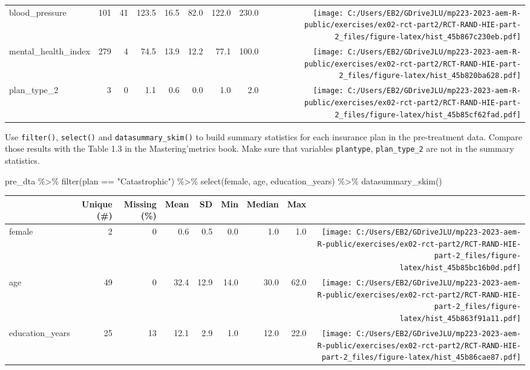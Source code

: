 \documentclass[
  letterpaper,
  DIV=11,
  numbers=noendperiod]{scrartcl}
\newenvironment{Shaded}{\begin{snugshade}}{\end{snugshade}}
\newcommand{\FunctionTok}[1]{\textcolor[rgb]{0.28,0.35,0.67}{#1}}
\newcommand{\NormalTok}[1]{\textcolor[rgb]{0.00,0.23,0.31}{#1}}
\newcommand{\SpecialCharTok}[1]{\textcolor[rgb]{0.37,0.37,0.37}{#1}}
\newcommand{\StringTok}[1]{\textcolor[rgb]{0.13,0.47,0.30}{#1}}
\begin{document}
\begin{table}
\begin{tabular}[t]{lrrrrrrr>{}r}
blood\_pressure & 101 & 41 & \num{123.5} & \num{16.5} & \num{82.0} & \num{122.0} & \num{230.0} & \texttt{[image: C:/Users/EB2/GDriveJLU/mp223-2023-aem-R-public/exercises/ex02-rct-part2/RCT-RAND-HIE-part-2\_files/figure-latex/hist\_45b867c230eb.pdf]}\\
mental\_health\_index & 279 & 4 & \num{74.5} & \num{13.9} & \num{12.2} & \num{77.1} & \num{100.0} & \texttt{[image: C:/Users/EB2/GDriveJLU/mp223-2023-aem-R-public/exercises/ex02-rct-part2/RCT-RAND-HIE-part-2\_files/figure-latex/hist\_45b820ba628.pdf]}\\
plan\_type\_2 & 3 & 0 & \num{1.1} & \num{0.6} & \num{0.0} & \num{1.0} & \num{2.0} & \texttt{[image: C:/Users/EB2/GDriveJLU/mp223-2023-aem-R-public/exercises/ex02-rct-part2/RCT-RAND-HIE-part-2\_files/figure-latex/hist\_45b85cf62fad.pdf]}\\
\bottomrule
\end{tabular}
\end{table}

Use \texttt{filter()}, \texttt{select()} and
\texttt{datasummary\_skim()} to build summary statistics for each
insurance plan in the pre-treatment data. Compare those results with the
Table 1.3 in the Mastering'metrics book. Make sure that variables
\texttt{plantype}, \texttt{plan\_type\_2} are not in the summary
statistics.

\begin{Shaded}
\begin{Highlighting}[]
\NormalTok{pre\_dta }\SpecialCharTok{\%\textgreater{}\%} 
  \FunctionTok{filter}\NormalTok{(plan }\SpecialCharTok{==} \StringTok{"Catastrophic"}\NormalTok{) }\SpecialCharTok{\%\textgreater{}\%} 
  \FunctionTok{select}\NormalTok{(female, age, education\_years) }\SpecialCharTok{\%\textgreater{}\%} 
  \FunctionTok{datasummary\_skim}\NormalTok{()}
\end{Highlighting}
\end{Shaded}

\begin{table}
\centering
\begin{tabular}[t]{lrrrrrrr>{}r}
\toprule
  & Unique (\#) & Missing (\%) & Mean & SD & Min & Median & Max &   \\
\midrule
female & 2 & 0 & \num{0.6} & \num{0.5} & \num{0.0} & \num{1.0} & \num{1.0} & \texttt{[image: C:/Users/EB2/GDriveJLU/mp223-2023-aem-R-public/exercises/ex02-rct-part2/RCT-RAND-HIE-part-2\_files/figure-latex/hist\_45b85bc16b0d.pdf]}\\
age & 49 & 0 & \num{32.4} & \num{12.9} & \num{14.0} & \num{30.0} & \num{62.0} & \texttt{[image: C:/Users/EB2/GDriveJLU/mp223-2023-aem-R-public/exercises/ex02-rct-part2/RCT-RAND-HIE-part-2\_files/figure-latex/hist\_45b863f91a11.pdf]}\\
education\_years & 25 & 13 & \num{12.1} & \num{2.9} & \num{1.0} & \num{12.0} & \num{22.0} & \texttt{[image: C:/Users/EB2/GDriveJLU/mp223-2023-aem-R-public/exercises/ex02-rct-part2/RCT-RAND-HIE-part-2\_files/figure-latex/hist\_45b86cae87.pdf]}\\
\bottomrule
\end{tabular}
\end{table}
\end{document}
